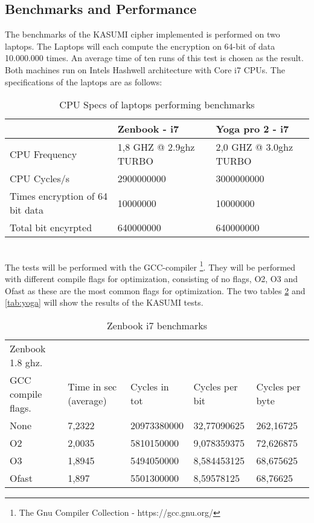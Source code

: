 \subsection{Benchmarks and Performance}
The benchmarks of the KASUMI cipher implemented is performed on two
laptops. The Laptops will each compute the encryption on 64-bit of
data 10.000.000 times. An average time of ten runs of this test is
chosen as the result. Both machines run on Intels Hashwell
architecture with Core i7 CPUs. The specifications of the laptops are as follows:
\begin{table}[h!]
    \begin{tabular}{l|l|l}
                                    & Zenbook - i7           & Yoga
                                                               pro 2 -
      i7\\ \hline
    CPU Frequency                   & 1,8 GHZ @ 2.9ghz TURBO & 2,0 GHZ @ 3.0ghz TURBO \\ \hline
    CPU Cycles/s                    & 2900000000             & 3000000000             \\ \hline
    Times encryption of 64 bit data & 10000000               & 10000000               \\ \hline
    Total bit encyrpted             & 640000000              & 640000000              \\
    \end{tabular}
    \caption{CPU Specs of laptops performing benchmarks}
    \label{tab:specs}
\end{table}\\
The tests will be performed with the
GCC-compiler \footnote{The Gnu Compiler Collection -
  https://gcc.gnu.org/}. They will be performed with different compile
flags for optimization, consisting of no flags, O2, O3 and Ofast as
these are the most common flags for optimization. The two tables
\ref{tab:zen} and \ref{tab:yoga} will show the results of the KASUMI
tests.
\begin{table}[h!]
    \begin{tabular}{l|l|l|l|l}
     Zenbook 1.8 ghz.  & ~                     & ~             & ~              & ~               \\
    GCC compile flags. & Time in sec (average) & Cycles in tot & Cycles per bit & Cycles per byte \\ \hline
    None               & 7,2322                & 20973380000   & 32,77090625    & 262,16725       \\ \hline
    O2                 & 2,0035                & 5810150000    & 9,078359375    & 72,626875       \\ \hline
    O3                 & 1,8945                & 5494050000    & 8,584453125    & 68,675625       \\ \hline
    Ofast              & 1,897                 & 5501300000    & 8,59578125     & 68,76625        \\
    \end{tabular}
    \caption{Zenbook i7 benchmarks}
    \label{tab:zen}
\end{table}
